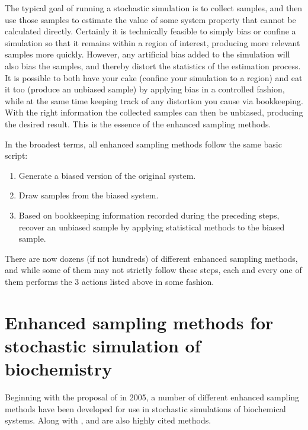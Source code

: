 The typical goal of running a stochastic simulation is to collect samples, and then use those samples to estimate the value of some system property that cannot be calculated directly. Certainly it is technically feasible to simply bias or confine a simulation so that it remains within a region of interest, producing more relevant samples more quickly. However, any artificial bias added to the simulation will also bias the samples, and thereby distort the statistics of the estimation process. It is possible to both have your cake (confine your simulation to a region) and eat it too (produce an unbiased sample) by applying bias in a controlled fashion, while at the same time keeping track of any distortion you cause via bookkeeping. With the right information the collected samples can then be unbiased, producing the desired result. This is the essence of the enhanced sampling methods.

In the broadest terms, all enhanced sampling methods follow the same basic script:
\begin{enumerate}
    \item Generate a biased version of the original system.
    \item Draw samples from the biased system.
    \item Based on bookkeeping information recorded during the preceding steps, recover an unbiased sample by applying statistical methods to the biased sample. 
\end{enumerate}
There are now dozens (if not hundreds) of different enhanced sampling methods, and while some of them may not strictly follow these steps, each and every one of them performs the 3 actions listed above in some fashion.

\section{Enhanced sampling methods for stochastic simulation of biochemistry}

Beginning with the proposal of  in 2005\cite{Allen:2005wy}, a number of different enhanced sampling methods have been developed for use in stochastic simulations of biochemical systems. Along with ,  and  are also highly cited methods.


